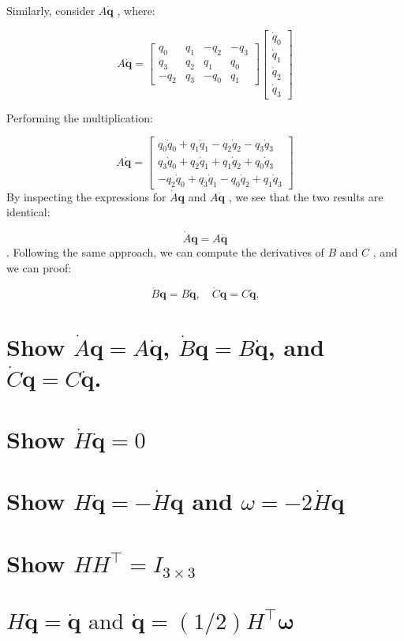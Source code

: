 \documentclass{article}
\begin{document}
Similarly, consider  $A\dot{\boldsymbol{q}}$ , where:

\begin{equation}
  A\dot{\boldsymbol{q}} = \begin{bmatrix}
    q_0 & q_1 & -q_2 & -q_3 \\
    q_3 & q_2 & q_1 & q_0 \\
    -q_2 & q_3 & -q_0 & q_1
    \end{bmatrix}
    \begin{bmatrix}
    \dot{q}_0 \\
    \dot{q}_1 \\
    \dot{q}_2 \\
    \dot{q}_3
    \end{bmatrix}    
\end{equation}

Performing the multiplication:

\begin{equation}
  A\dot{\boldsymbol{q}} = \begin{bmatrix}
    q_0\dot{q}_0 + q_1\dot{q}_1 - q_2\dot{q}_2 - q_3\dot{q}_3 \\
    q_3\dot{q}_0 + q_2\dot{q}_1 + q_1\dot{q}_2 + q_0\dot{q}_3 \\
    -q_2\dot{q}_0 + q_3\dot{q}_1 - q_0\dot{q}_2 + q_1\dot{q}_3
    \end{bmatrix}    
\end{equation}
By inspecting the expressions for $\dot{A}\boldsymbol{q}$  and  $A\dot{\boldsymbol{q}}$ , we see that the two results are identical:

\begin{equation}
  \dot{A}\boldsymbol{q} = A\dot{\boldsymbol{q}}
\end{equation}.
Following the same approach, we can compute the derivatives of  $B$  and  $C$ , and we can proof:

\begin{equation}
  \dot{B}\boldsymbol{q} = B\dot{\boldsymbol{q}}, \quad \dot{C}\boldsymbol{q} = C\dot{\boldsymbol{q}}.

\end{equation}


\section{Show $\dot{A}\boldsymbol{q}=A\dot{\boldsymbol{q}}$, $\dot{B}\boldsymbol{q}=B\dot{\boldsymbol{q}}$, and $\dot{C}\boldsymbol{q}=C\dot{\boldsymbol{q}}$.}

\section{Show $\dot{H}\dot{\boldsymbol{q}}=0$}

\section{Show $H\dot{\boldsymbol{q}} = -\dot{H}\boldsymbol{q}$ and $\omega = -2\dot{H}\boldsymbol{q}$}

\section{Show $H H^{\top}=I_{3 \times 3}$}

\section{$H \dot{\boldsymbol{q}}=\dot{\boldsymbol{q}} \text { and } \dot{\boldsymbol{q}}=(1 / 2) H^{\top} \boldsymbol{\omega}$}
\end{document}
